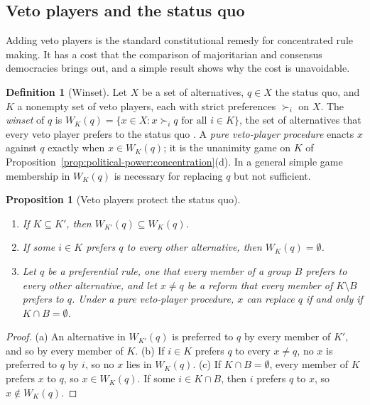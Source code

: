 \documentclass[11pt,letterpaper]{article}
\newtheorem{proposition}[theorem]{Proposition}
\theoremstyle{definition}
\newtheorem{definition}[theorem]{Definition}
\theoremstyle{remark}
\begin{document}
\subsection{Veto players and the status quo}

Adding veto players is the standard constitutional remedy for concentrated rule making. It has a cost that the comparison of majoritarian and consensus democracies brings out, and a simple result shows why the cost is unavoidable.

\begin{definition}[Winset]
\label{def:political-power:veto-players}
Let $X$ be a set of alternatives, $q\in X$ the status quo, and $K$ a nonempty set of veto players, each with strict preferences $\succ_i$ on $X$. The \emph{winset} of $q$ is $W_K(q)=\{x\in X: x\succ_i q\text{ for all }i\in K\}$, the set of alternatives that every veto player prefers to the status quo \citep{tsebelis2002}. A \emph{pure veto-player procedure} enacts $x$ against $q$ exactly when $x\in W_K(q)$; it is the unanimity game on $K$ of Proposition~\ref{prop:political-power:concentration}(d). In a general simple game membership in $W_K(q)$ is necessary for replacing $q$ but not sufficient.
\end{definition}

\begin{proposition}[Veto players protect the status quo]
\label{prop:political-power:veto}
\leavevmode
\begin{enumerate}[label=(\alph*)]
\item If $K\subseteq K'$, then $W_{K'}(q)\subseteq W_K(q)$.
\item If some $i\in K$ prefers $q$ to every other alternative, then $W_K(q)=\emptyset$.
\item Let $q$ be a preferential rule, one that every member of a group $B$ prefers to every other alternative, and let $x\neq q$ be a reform that every member of $K\setminus B$ prefers to $q$. Under a pure veto-player procedure, $x$ can replace $q$ if and only if $K\cap B=\emptyset$.
\end{enumerate}
\end{proposition}

\begin{proof}
(a) An alternative in $W_{K'}(q)$ is preferred to $q$ by every member of $K'$, and so by every member of $K$. (b) If $i\in K$ prefers $q$ to every $x\neq q$, no $x$ is preferred to $q$ by $i$, so no $x$ lies in $W_K(q)$. (c) If $K\cap B=\emptyset$, every member of $K$ prefers $x$ to $q$, so $x\in W_K(q)$. If some $i\in K\cap B$, then $i$ prefers $q$ to $x$, so $x\notin W_K(q)$.
\end{proof}
\end{document}
